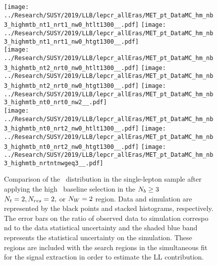 \begin{figure}[!htb]
	\begin{center}
  \texttt{[image: ../Research/SUSY/2019/LLB/lepcr\_allEras/MET\_pt\_DataMC\_hm\_nb3\_highmtb\_nt1\_nrt1\_nw0\_htlt1300\_\_.pdf]} 
  \texttt{[image: ../Research/SUSY/2019/LLB/lepcr\_allEras/MET\_pt\_DataMC\_hm\_nb3\_highmtb\_nt1\_nrt1\_nw0\_htgt1300\_\_.pdf]} \\  
  \texttt{[image: ../Research/SUSY/2019/LLB/lepcr\_allEras/MET\_pt\_DataMC\_hm\_nb3\_highmtb\_nt2\_nrt0\_nw0\_htlt1300\_\_.pdf]} 
  \texttt{[image: ../Research/SUSY/2019/LLB/lepcr\_allEras/MET\_pt\_DataMC\_hm\_nb3\_highmtb\_nt2\_nrt0\_nw0\_htgt1300\_\_.pdf]} 
  \texttt{[image: ../Research/SUSY/2019/LLB/lepcr\_allEras/MET\_pt\_DataMC\_hm\_nb3\_highmtb\_nt0\_nrt0\_nw2\_\_.pdf]} \\
  \texttt{[image: ../Research/SUSY/2019/LLB/lepcr\_allEras/MET\_pt\_DataMC\_hm\_nb3\_highmtb\_nt0\_nrt2\_nw0\_htlt1300\_\_.pdf]} 
  \texttt{[image: ../Research/SUSY/2019/LLB/lepcr\_allEras/MET\_pt\_DataMC\_hm\_nb3\_highmtb\_nt0\_nrt2\_nw0\_htgt1300\_\_.pdf]} 
  \texttt{[image: ../Research/SUSY/2019/LLB/lepcr\_allEras/MET\_pt\_DataMC\_hm\_nb3\_highmtb\_nrtntnwgeq3\_\_.pdf]} \\
	\end{center}
	\caption[Lost Lepton HM Control Region $\nb\geq3$ with 2 heavy objects]{Comparison of the \met~distribution in the single-lepton sample after applying the high \dm~baseline selection in the $\nb\geq3$ $N_{t}=2, N_{res}=2,$ or $N_{W}=2$ region. Data and simulation are represented by the black points and stacked histograms, respectively. The error bars on the ratio of observed data to simulation correspo    nd to the data statistical uncertainty and the shaded blue band represents the statistical uncertainty on the simulation. These regions are included with the search regions in the simultaneous fit for the signal extraction in order to estimate the LL contribution.
	 }
	\label{fig:llb-1lcr-datavsmc-hm-nb3-2}
\end{figure}
